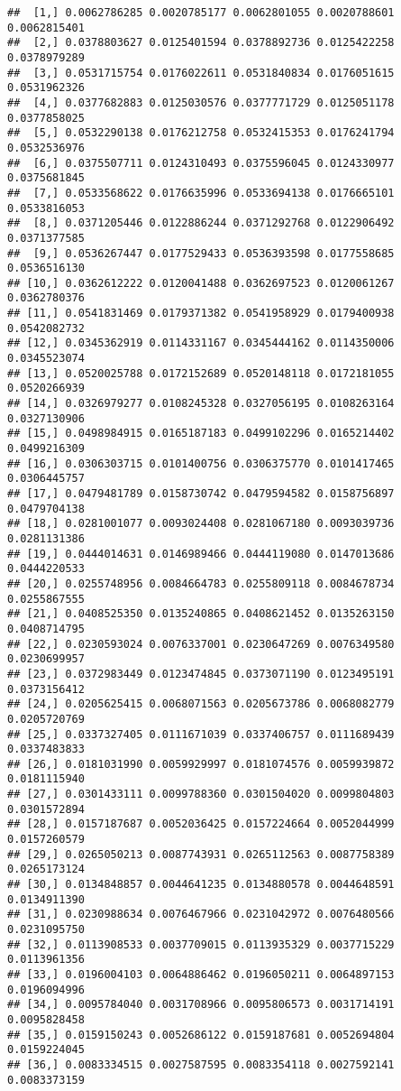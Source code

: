 \documentclass[]{article}
\begin{document}
\begin{verbatim}
##  [1,] 0.0062786285 0.0020785177 0.0062801055 0.0020788601 0.0062815401
##  [2,] 0.0378803627 0.0125401594 0.0378892736 0.0125422258 0.0378979289
##  [3,] 0.0531715754 0.0176022611 0.0531840834 0.0176051615 0.0531962326
##  [4,] 0.0377682883 0.0125030576 0.0377771729 0.0125051178 0.0377858025
##  [5,] 0.0532290138 0.0176212758 0.0532415353 0.0176241794 0.0532536976
##  [6,] 0.0375507711 0.0124310493 0.0375596045 0.0124330977 0.0375681845
##  [7,] 0.0533568622 0.0176635996 0.0533694138 0.0176665101 0.0533816053
##  [8,] 0.0371205446 0.0122886244 0.0371292768 0.0122906492 0.0371377585
##  [9,] 0.0536267447 0.0177529433 0.0536393598 0.0177558685 0.0536516130
## [10,] 0.0362612222 0.0120041488 0.0362697523 0.0120061267 0.0362780376
## [11,] 0.0541831469 0.0179371382 0.0541958929 0.0179400938 0.0542082732
## [12,] 0.0345362919 0.0114331167 0.0345444162 0.0114350006 0.0345523074
## [13,] 0.0520025788 0.0172152689 0.0520148118 0.0172181055 0.0520266939
## [14,] 0.0326979277 0.0108245328 0.0327056195 0.0108263164 0.0327130906
## [15,] 0.0498984915 0.0165187183 0.0499102296 0.0165214402 0.0499216309
## [16,] 0.0306303715 0.0101400756 0.0306375770 0.0101417465 0.0306445757
## [17,] 0.0479481789 0.0158730742 0.0479594582 0.0158756897 0.0479704138
## [18,] 0.0281001077 0.0093024408 0.0281067180 0.0093039736 0.0281131386
## [19,] 0.0444014631 0.0146989466 0.0444119080 0.0147013686 0.0444220533
## [20,] 0.0255748956 0.0084664783 0.0255809118 0.0084678734 0.0255867555
## [21,] 0.0408525350 0.0135240865 0.0408621452 0.0135263150 0.0408714795
## [22,] 0.0230593024 0.0076337001 0.0230647269 0.0076349580 0.0230699957
## [23,] 0.0372983449 0.0123474845 0.0373071190 0.0123495191 0.0373156412
## [24,] 0.0205625415 0.0068071563 0.0205673786 0.0068082779 0.0205720769
## [25,] 0.0337327405 0.0111671039 0.0337406757 0.0111689439 0.0337483833
## [26,] 0.0181031990 0.0059929997 0.0181074576 0.0059939872 0.0181115940
## [27,] 0.0301433111 0.0099788360 0.0301504020 0.0099804803 0.0301572894
## [28,] 0.0157187687 0.0052036425 0.0157224664 0.0052044999 0.0157260579
## [29,] 0.0265050213 0.0087743931 0.0265112563 0.0087758389 0.0265173124
## [30,] 0.0134848857 0.0044641235 0.0134880578 0.0044648591 0.0134911390
## [31,] 0.0230988634 0.0076467966 0.0231042972 0.0076480566 0.0231095750
## [32,] 0.0113908533 0.0037709015 0.0113935329 0.0037715229 0.0113961356
## [33,] 0.0196004103 0.0064886462 0.0196050211 0.0064897153 0.0196094996
## [34,] 0.0095784040 0.0031708966 0.0095806573 0.0031714191 0.0095828458
## [35,] 0.0159150243 0.0052686122 0.0159187681 0.0052694804 0.0159224045
## [36,] 0.0083334515 0.0027587595 0.0083354118 0.0027592141 0.0083373159

\end{verbatim}
\end{document}
